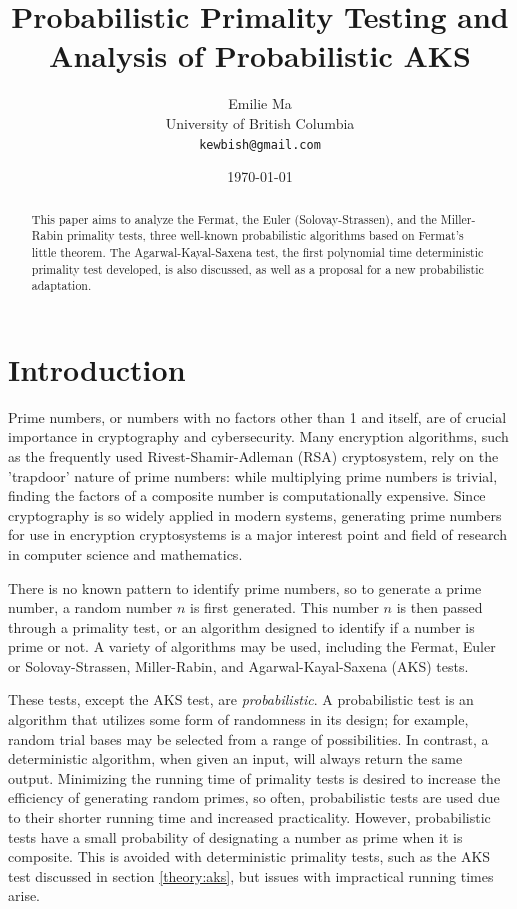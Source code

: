 \documentclass{article}
\title[Primality Testing]{Probabilistic Primality Testing and Analysis of Probabilistic AKS}
\author[Emilie Ma]{%
Emilie Ma\\%
University of British Columbia\\%
\texttt{kewbish@gmail.com}%
}
\date{\today}
\begin{document}
\maketitle
\newpage
\begin{abstract}
This paper aims to analyze the Fermat, the Euler (Solovay-Strassen), and the Miller-Rabin primality tests, three well-known probabilistic algorithms based on Fermat's little theorem. The Agarwal-Kayal-Saxena test, the first polynomial time deterministic primality test developed, is also discussed, as well as a proposal for a new probabilistic adaptation.
\end{abstract}

\section{Introduction}
Prime numbers, or numbers with no factors other than 1 and itself, are of crucial importance in cryptography and cybersecurity. Many encryption algorithms, such as the frequently used Rivest-Shamir-Adleman (RSA) cryptosystem, rely on the 'trapdoor' nature of prime numbers: while multiplying prime numbers is trivial, finding the factors of a composite number is computationally expensive. Since cryptography is so widely applied in modern systems, generating prime numbers for use in encryption cryptosystems is a major interest point and field of research in computer science and mathematics.

There is no known pattern to identify prime numbers, so to generate a prime number, a random number $n$ is first generated. This number $n$ is then passed through a primality test, or an algorithm designed to identify if a number is prime or not. A variety of algorithms may be used, including the Fermat, Euler or Solovay-Strassen, Miller-Rabin, and Agarwal-Kayal-Saxena (AKS) tests.

These tests, except the AKS test, are \emph{probabilistic}. A probabilistic test is an algorithm that utilizes some form of randomness in its design; for example, random trial bases may be selected from a range of possibilities. In contrast, a deterministic algorithm, when given an input, will always return the same output. Minimizing the running time of primality tests is desired to increase the efficiency of generating random primes, so often, probabilistic tests are used due to their shorter running time and increased practicality. However, probabilistic tests have a small probability of designating a number as prime when it is composite. This is avoided with deterministic primality tests, such as the AKS test discussed in section \ref{theory:aks}, but issues with impractical running times arise.
\end{document}
